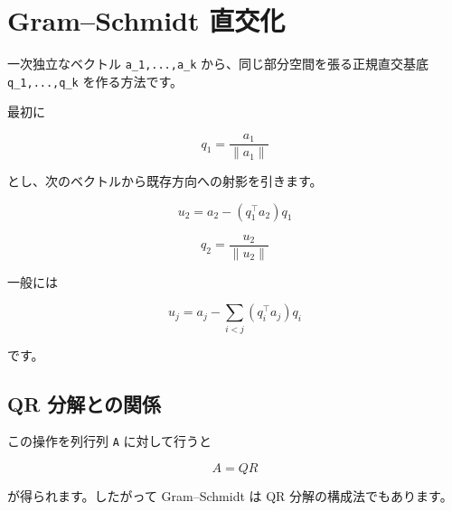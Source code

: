\documentclass[
  11pt,
  a4paper,
]{ltjsarticle}
\author{}
\date{}
\begin{document}
\hypertarget{gramschmidt-ux76f4ux4ea4ux5316}{%
\section{Gram--Schmidt 直交化}\label{gramschmidt-ux76f4ux4ea4ux5316}}

一次独立なベクトル \texttt{a\_1,...,a\_k}
から、同じ部分空間を張る正規直交基底 \texttt{q\_1,...,q\_k}
を作る方法です。

最初に

\[
q_1=\frac{a_1}{\|a_1\|}
\]

とし、次のベクトルから既存方向への射影を引きます。

\[
u_2=a_2-(q_1^\top a_2)q_1
\]

\[
q_2=\frac{u_2}{\|u_2\|}
\]

一般には

\[
u_j=a_j-\sum_{i<j}(q_i^\top a_j)q_i
\]

です。

\hypertarget{qr-ux5206ux89e3ux3068ux306eux95a2ux4fc2}{%
\subsection{QR
分解との関係}\label{qr-ux5206ux89e3ux3068ux306eux95a2ux4fc2}}

この操作を列行列 \texttt{A} に対して行うと

\[
A=QR
\]

が得られます。したがって Gram--Schmidt は QR 分解の構成法でもあります。
\end{document}
